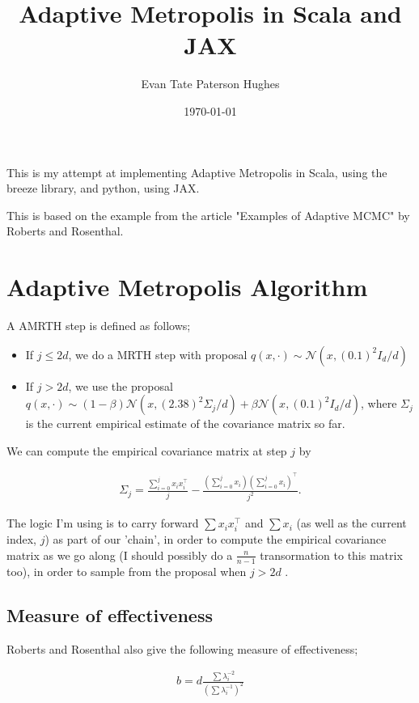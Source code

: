 \documentclass[letterpaper]{article}
\author{Evan Tate Paterson Hughes}
\date{\today}
\title{Adaptive Metropolis in Scala and JAX}
\begin{document}
\maketitle

This is my attempt at implementing Adaptive Metropolis in Scala, using the breeze library, and python, using JAX.

This is based on the example from the article "Examples of Adaptive MCMC" by Roberts and Rosenthal.
\section{Adaptive Metropolis Algorithm}
\label{sec:orgeac033e}

A AMRTH step is defined as follows;
\begin{itemize}
\item If \(j\leq 2d\), we do a MRTH step with proposal \(q(x,\cdot)\sim \mathcal N(x,(0.1)^2I_d/d)\)
\item If \(j>2d\), we use the proposal \(q(x,\cdot)\sim(1-\beta)\mathcal N(x,(2.38)^2\Sigma_j/d)+\beta\mathcal N(x,(0.1)^2I_d/d)\), where \(\Sigma_j\) is the current empirical estimate of the covariance matrix so far.
\end{itemize}

We can compute the empirical covariance matrix at step \(j\) by

$$\begin{aligned}
\Sigma_j=\frac{{\sum_{i=0}^j} x_ix_i^{\intercal}}{j} - \frac{({\sum_{i=0}^j} x_i)({\sum_{i=0}^j} x_i)^{\intercal}}{j^2}.
\end{aligned}$$

The logic I'm using is to carry forward \(\sum x_ix_i^{\intercal}\) and \(\sum x_i\) (as well as the current index, \(j\)) as part of our 'chain', in order to compute the empirical covariance matrix as we go along (I should possibly do a \(\frac{n}{n-1}\) transormation to this matrix too), in order to sample from the proposal when \(j>2d\) .
\subsection{Measure of effectiveness}
\label{sec:org59680fb}

Roberts and Rosenthal also give the following measure of effectiveness;

$$\begin{aligned}
b = d\frac{\sum \lambda_i^{-2}}{(\sum \lambda_i^{-1})^2 }
\end{aligned}$$
\end{document}
